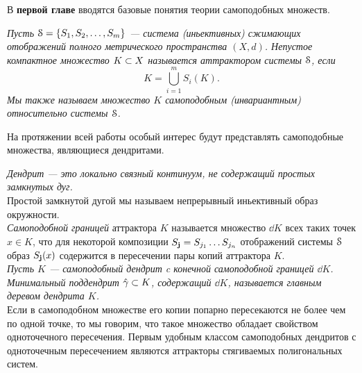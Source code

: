 \documentclass[a5paper,9pt,twoside]{extarticle} %
\begin{document}
В \textbf{первой главе} вводятся базовые понятия теории самоподобных множеств.

{\em  Пусть ${\EuScript S}=\{S_1, S_2, \ldots, S_m\}$ ---  система (иньективных) сжимающих отображений полного метрического пространства $(X, d)$.
Непустое компактное множество $K\subset X$ называется аттрактором системы ${\EuScript S}$, если 
$$K = \bigcup \limits_{i=1}^m S_i (K).$$
Мы также называем множество $K$ самоподобным (инвариантным) относительно системы ${\EuScript S}$.}

На протяжении всей работы особый интерес будут представлять самоподобные множества, являющиеся дендритами. 

{\em {\em Дендрит} --- это локально связный континуум, не содержащий простых замкнутых дуг. }\\

Простой замкнутой дугой мы называем непрерывный иньективный образ окружности.\\

{\em Самоподобной границей} аттрактора $K$ называется множество $\dd K$ всех таких точек $x\in K$, что для некоторой композиции $S_{\bf{j}}=S_{j_1}\ldots S_{j_n}$ отображений системы ${\EuScript S}$ образ $S_{\bf{j}}(x)$ содержится в пересечении пары копий аттрактора $K$.\\

{\em Пусть $K$ --- самоподобный дендрит c конечной самоподобной границей $\dd K$. 
Минимальный поддендрит $\hat\gamma\subset K$, содержащий $\dd K$, называется {\em главным деревом} дендрита $K$.}\\


Если в самоподобном множестве его копии попарно пересекаются не более чем по одной точке, то мы говорим, что такое множество обладает свойством одноточечного пересечения.
Первым удобным классом самоподобных дендритов с одноточечным пересечением являются аттракторы стягиваемых полигональных систем.\\
\end{document}
